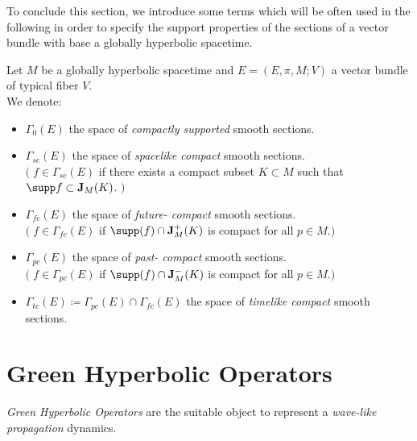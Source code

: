 \documentclass[Main]{subfiles}
\begin{document}
			To conclude this section, we introduce some terms which will be often used in the following in order to
specify the support properties of the sections of a vector bundle with base a globally hyperbolic spacetime.
			\begin{notationfix}
			
				Let $M$ be a globally hyperbolic spacetime and $E=(E,\pi,M;V)$ a vector bundle of typical fiber $V$.\\
				We denote:
				\begin{itemize}
					\item $\Gamma_0(E)$ the space of \emph{compactly supported} smooth sections.
					\item $\Gamma_{sc}(E)$  the space of \emph{spacelike compact} smooth sections.\\
						$\big(\; f\in \Gamma_{sc}(E)$ if there exists a compact subset $K \subset M$  such that $\supp f \subset \mathbf{J}_M(K)$. $\big)$
					\item  $\Gamma_{fc}(E) $ the space of \emph{future- compact} smooth sections.\\
						$\big(\; f\in \Gamma_{fc}(E) $ if  $\supp(f) \cap  \mathbf{J}^+_M(K)$ is compact for all $p\in M$.$\big)$
					\item  $\Gamma_{pc}(E) $ the space of \emph{past- compact} smooth sections.\\
						$\big(\; f\in \Gamma_{pc}(E) $ if  $\supp(f) \cap  \mathbf{J}^-_M(K)$ is compact for all $p\in M$.$\big)$
					\item $\Gamma_{tc}(E) \coloneqq \Gamma_{pc}(E) \cap \Gamma_{fc}(E) $ the space of \emph{timelike compact} smooth sections.
				\end{itemize}
			\end{notationfix}				
			

		

		\section{Green Hyperbolic Operators}
					\emph{Green Hyperbolic Operators} are the suitable object to represent a \emph{wave-like propagation} dynamics.
					
\end{document}
